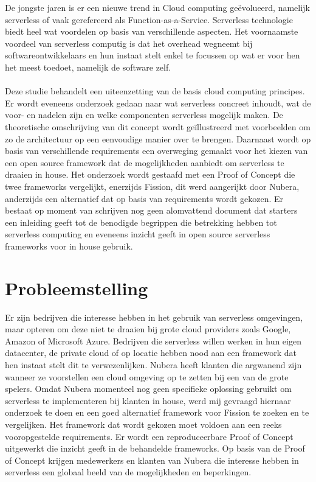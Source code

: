 De jongste jaren is er een nieuwe trend in Cloud computing geëvolueerd, namelijk serverless of vaak gerefereerd als Function-as-a-Service. Serverless technologie biedt heel wat voordelen op basis van verschillende aspecten. Het voornaamste voordeel van serverless computig is dat het overhead wegneemt bij softwareontwikkelaars en hun instaat stelt enkel te focussen op wat er voor hen het meest toedoet, namelijk de software zelf.
\\\\
Deze studie behandelt een uiteenzetting van de basis cloud computing principes. Er wordt eveneens onderzoek gedaan naar wat serverless concreet inhoudt, wat de voor- en nadelen zijn en welke componenten serverless mogelijk maken. De theoretische omschrijving van dit concept wordt geïllustreerd met voorbeelden om zo de architectuur op een eenvoudige manier over te brengen. Daarnaast wordt op basis van verschillende requirements een overweging gemaakt voor het kiezen van een open source framework dat de mogelijkheden aanbiedt om serverless te draaien in house. Het onderzoek wordt gestaafd met een Proof of Concept die twee frameworks vergelijkt, enerzijds Fission, dit werd aangerijkt door Nubera, anderzijds een alternatief dat op basis van requirements wordt gekozen. Er bestaat op moment van schrijven nog geen alomvattend document dat starters een inleiding geeft tot de benodigde begrippen die betrekking hebben tot serverless computing en eveneens inzicht geeft in open source serverless frameworks voor in house gebruik.

\section{Probleemstelling}
\label{sec:probleemstelling}

Er zijn bedrijven die interesse hebben in het gebruik van serverless omgevingen, maar opteren om deze niet te draaien bij grote cloud providers zoals Google, Amazon of Microsoft Azure. Bedrijven die serverless willen werken in hun eigen datacenter, de private cloud of op locatie hebben nood aan een framework dat hen instaat stelt dit te verwezenlijken. Nubera heeft klanten die argwanend zijn wanneer ze voorstellen een cloud omgeving op te zetten bij een van de grote spelers. Omdat Nubera momenteel nog geen specifieke oplossing gebruikt om serverless te implementeren bij klanten in house, werd mij gevraagd hiernaar onderzoek te doen en een goed alternatief framework voor Fission te zoeken en te vergelijken. Het framework dat wordt gekozen moet voldoen aan een reeks vooropgestelde requirements. Er wordt een reproduceerbare Proof of Concept uitgewerkt die inzicht geeft in de behandelde frameworks. Op basis van de Proof of Concept krijgen medewerkers en klanten van Nubera die interesse hebben in serverless een globaal beeld van de mogelijkheden en beperkingen.

